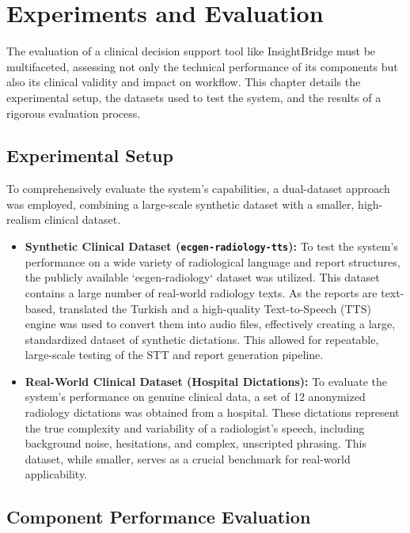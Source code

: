 \chapter{Experiments and Evaluation}
\label{cha:evaluation}

The evaluation of a clinical decision support tool like InsightBridge must be multifaceted, assessing not only the technical performance of its components but also its clinical validity and impact on workflow. This chapter details the experimental setup, the datasets used to test the system, and the results of a rigorous evaluation process.

\section{Experimental Setup}

To comprehensively evaluate the system's capabilities, a dual-dataset approach was employed, combining a large-scale synthetic dataset with a smaller, high-realism clinical dataset.

\begin{itemize}
    \item \textbf{Synthetic Clinical Dataset (\texttt{ecgen-radiology-tts}):} To test the system's performance on a wide variety of radiological language and report structures, the publicly available `ecgen-radiology` dataset was utilized. This dataset contains a large number of real-world radiology texts. As the reports are text-based, translated the Turkish and a high-quality Text-to-Speech (TTS) engine was used to convert them into audio files, effectively creating a large, standardized dataset of synthetic dictations. This allowed for repeatable, large-scale testing of the STT and report generation pipeline.
    
    \item \textbf{Real-World Clinical Dataset (Hospital Dictations):} To evaluate the system's performance on genuine clinical data, a set of 12 anonymized radiology dictations was obtained from a hospital. These dictations represent the true complexity and variability of a radiologist's speech, including background noise, hesitations, and complex, unscripted phrasing. This dataset, while smaller, serves as a crucial benchmark for real-world applicability.
\end{itemize}

\section{Component Performance Evaluation}

